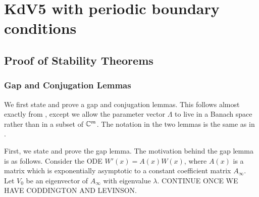 \documentclass[thesis.tex]{subfiles}
\begin{document}
\chapter{KdV5 with periodic boundary conditions}

\section{Proof of Stability Theorems}

\subsection{Gap and Conjugation Lemmas}

We first state and prove a gap and conjugation lemmas. This follows almost exactly from \cite{Zumbrun2009}, except we allow the parameter vector $\Lambda$ to live in a Banach space rather than in a subset of ${\mathbb C}^m$. The notation in the two lemmas is the same as in \cite{Zumbrun2009}. 

First, we state and prove the gap lemma. The motivation behind the gap lemma is as follows. Consider the ODE $W'(x) = A(x)W(x)$, where $A(x)$ is a matrix which is exponentially asymptotic to a constant coefficient matrix $A_\infty$. Let $V_0$ be an eigenvector of $A_\infty$ with eigenvalue $\lambda$. CONTINUE ONCE WE HAVE CODDINGTON AND LEVINSON.
\end{document}
